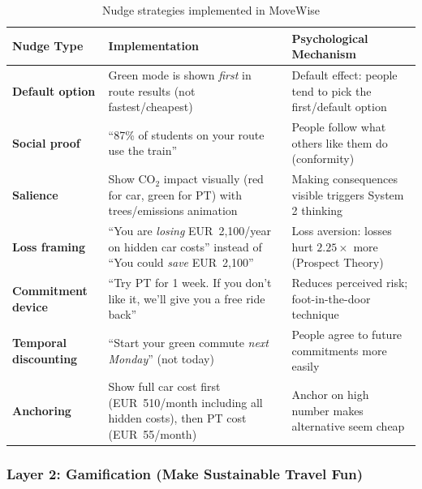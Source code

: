 \documentclass[11pt,a4paper]{article}
\begin{document}
\begin{table}[H]
\centering
\caption{Nudge strategies implemented in MoveWise}
\begin{tabular}{@{}p{3cm}p{4.5cm}p{5cm}@{}}
\toprule
\textbf{Nudge Type} & \textbf{Implementation} & \textbf{Psychological Mechanism} \\
\midrule
\textbf{Default option} & Green mode is shown \textit{first} in route results (not fastest/cheapest) & Default effect: people tend to pick the first/default option \\
\addlinespace
\textbf{Social proof} & ``87\% of students on your route use the train'' & People follow what others like them do (conformity) \\
\addlinespace
\textbf{Salience} & Show CO$_2$ impact visually (red for car, green for PT) with trees/emissions animation & Making consequences visible triggers System 2 thinking \\
\addlinespace
\textbf{Loss framing} & ``You are \textit{losing} EUR~2,100/year on hidden car costs'' instead of ``You could \textit{save} EUR~2,100'' & Loss aversion: losses hurt $2.25\times$ more (Prospect Theory) \\
\addlinespace
\textbf{Commitment device} & ``Try PT for 1 week. If you don't like it, we'll give you a free ride back'' & Reduces perceived risk; foot-in-the-door technique \\
\addlinespace
\textbf{Temporal discounting} & ``Start your green commute \textit{next Monday}'' (not today) & People agree to future commitments more easily \\
\addlinespace
\textbf{Anchoring} & Show full car cost first (EUR~510/month including all hidden costs), then PT cost (EUR~55/month) & Anchor on high number makes alternative seem cheap \\
\bottomrule
\end{tabular}
\end{table}

\subsubsection{Layer 2: Gamification (Make Sustainable Travel Fun)}
\end{document}
